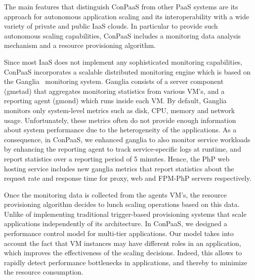 The main features that distinguish ConPaaS from other PaaS systems are its approach for autonomous application scaling and its interoperability with a wide variety of private and public IaaS clouds. In particular to provide such autonomous scaling capabilities, ConPaaS includes a monitoring data analysis mechanism  and a resource provisioning algorithm.

Since most IaaS does not implement any sophisticated monitoring capabilities, ConPaaS incorporates a scalable distributed monitoring engine which is based on the Ganglia~\cite{} monitoring system. Ganglia consists of a server component (gmetad) that aggregates monitoring statistics from various VM's, and a reporting agent (gmond) which runs inside each VM. By default, Ganglia monitors only system-level metrics such as disk, CPU, memory and network usage. Unfortunately, these metrics often do not provide enough information about system performance due to the heterogeneity of the applications. As a consequence, in ConPaaS, we enhanced ganglia to also monitor service workloads by enhancing the reporting agent to track service-specific logs at runtime, and report statistics over a reporting period of 5 minutes. Hence, the PhP web hosting service includes new ganglia metrics that report statistics about the request rate and response time for proxy, web and FPM-PhP servers respectively.

Once the monitoring data is collected from the agents VM's, the resource provisioning  algorithm decides to lunch scaling operations based on this data. Unlike of implementing traditional trigger-based provisioning systems that scale applications independently of its architecture. In ConPaaS, we designed a performance control model for multi-tier applications. Our model takes into account the fact that VM instances may have different roles in an application, which improves the effectiveness of the scaling decisions. Indeed, this allows to rapidly detect performance bottlenecks in applications, and thereby to minimize the resource consumption.




 

